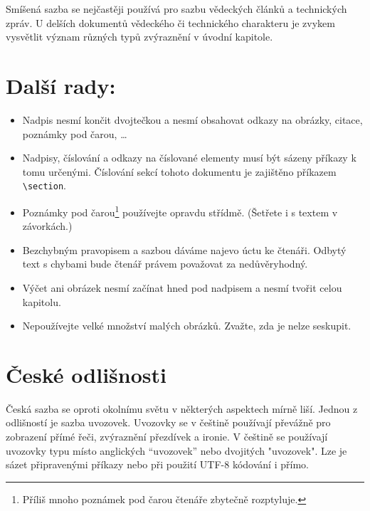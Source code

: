 \documentclass[10pt, twocolumn]{article}    %
\begin{document}
        Smíšená sazba se nejčastěji používá pro sazbu vědeckých článků a technických zpráv.
        U delších dokumentů vědeckého či technického charakteru je zvykem vysvětlit význam různých typů zvýraznění v úvodní kapitole.

    \section{Další rady:}
        \begin{itemize}
            \item Nadpis nesmí končit dvojtečkou a nesmí obsahovat odkazy na obrázky, citace, poznámky pod čarou, \dots

           \item  Nadpisy, číslování a odkazy na číslované elementy musí být sázeny příkazy k tomu určenými.
           Číslování sekcí tohoto dokumentu je zajištěno příkazem \verb|\section|.

            \item Poznámky pod čarou\footnote{Příliš mnoho poznámek pod čarou čtenáře zbytečně rozptyluje.} používejte opravdu střídmě.
            (Šetřete i s textem v závorkách.)

            \item Bezchybným pravopisem a sazbou dáváme najevo úctu ke čtenáři.
            Odbytý text s chybami bude čtenář právem považovat za nedůvěryhodný.

            \item Výčet ani obrázek nesmí začínat hned pod nadpisem a nesmí tvořit celou kapitolu.

            \item Nepoužívejte velké množství malých obrázků.
            Zvažte, zda je nelze seskupit.
        \end{itemize}
    
    \section{České odlišnosti}

        Česká sazba se oproti okolnímu světu v některých aspektech mírně liší.
        Jednou z odlišností je sazba uvozovek.
        Uvozovky se v češtině používají převážně pro zobrazení přímé řeči, zvýraznění přezdívek a ironie.
        V češtině se používají uvozovky typu  místo anglických ``uvozovek'' nebo dvojitých "uvozovek".
        Lze je sázet připravenými příkazy nebo při použití UTF-8 kódování i přímo.
\end{document}

